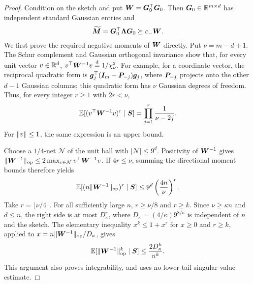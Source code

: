 \documentclass{article}
\theoremstyle{plain} %
\theoremstyle{definition} %
\theoremstyle{definition} %
\begin{document}
\begin{proof}
Condition on the sketch and put $\boldsymbol{W}=\boldsymbol{G}_0^\top\boldsymbol{G}_0$.
Then $\boldsymbol{G}_0\in{\mathbb{R}}^{m\times d}$ has independent standard Gaussian entries and
\begin{align}
    \widetilde{\boldsymbol{M}}=\boldsymbol{G}_0^\top\boldsymbol{\Lambda}\boldsymbol{G}_0
    \succeq c_-\boldsymbol{W}.
    \label{eq:M-inverse-PSD-lower}
\end{align}
We first prove the required negative moments of $\boldsymbol{W}$ directly.
Put $\nu=m-d+1$. The Schur complement and Gaussian orthogonal invariance
show that, for every unit vector $v\in{\mathbb{R}}^d$,
$v^\top\boldsymbol{W}^{-1}v\stackrel{\rm d}{=}1/\chi^2_\nu$.
For example, for a coordinate vector, the reciprocal quadratic form is
$\boldsymbol{g}_j^\top(\boldsymbol{I}_m-\boldsymbol{P}_{-j})\boldsymbol{g}_j$, where $\boldsymbol{P}_{-j}$ projects onto
the other $d-1$ Gaussian columns; this quadratic form has $\nu$ Gaussian degrees of freedom.
Thus, for every integer $r\geq1$ with $2r<\nu$,
\begin{align*}
    {\mathbb{E}}[(v^\top\boldsymbol{W}^{-1}v)^r\mid\boldsymbol{S}]
       =\prod_{j=1}^r\frac1{\nu-2j}.
\end{align*}
For $\lVert v\rVert\leq1$, the same expression is an upper bound.

Choose a $1/4$-net $\mathcal N$ of the unit ball with
$|\mathcal N|\leq9^d$. Positivity of $\boldsymbol{W}^{-1}$ gives
$\lVert\boldsymbol{W}^{-1}\rVert_{\rm op}\leq2\max_{v\in\mathcal N}v^\top\boldsymbol{W}^{-1}v$.
If $4r\leq\nu$, summing the directional moment bounds therefore yields
\begin{align*}
    {\mathbb{E}}[(n\lVert\boldsymbol{W}^{-1}\rVert_{\rm op})^r\mid\boldsymbol{S}]
       \leq9^d\left(\frac{4n}{\nu}\right)^r.
\end{align*}
Take $r=\lfloor\nu/4\rfloor$. For all sufficiently large $n$,
$r\geq\nu/8$ and $r\geq k$. Since $\nu\geq\kappa n$ and $d\leq n$,
the right side is at most $D_\kappa^r$, where
$D_\kappa=(4/\kappa)9^{8/\kappa}$ is independent of $n$ and the sketch.
The elementary inequality $x^k\leq1+x^r$ for $x\geq0$ and $r\geq k$,
applied to $x=n\lVert\boldsymbol{W}^{-1}\rVert_{\rm op}/D_\kappa$, gives
\begin{align}
    {\mathbb{E}}[\lVert\boldsymbol{W}^{-1}\rVert_{\rm op}^k\mid\boldsymbol{S}]
       \leq\frac{2D_\kappa^k}{n^k}.
    \label{eq:Wishart-inverse-op-moment}
\end{align}
This argument also proves integrability, and uses no lower-tail
singular-value estimate.


\end{proof}
\end{document}
